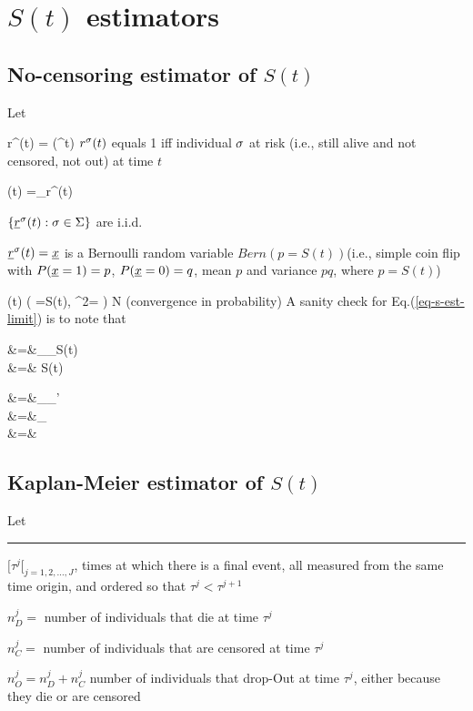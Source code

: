 \section{$S(t)$ estimators}

\subsection{No-censoring estimator of $S(t)$}

Let


\beq
r^\s(t) =  \indi(\tau^\s\geq t)
\eeq
$r^\sigma(t)$ equals 1 iff individual $\sigma$
at risk (i.e., still alive
and not censored, not out) at time $t$

\beq
{}(t) =\sum_\s r^\s(t)
\eeq

$\{{\underline{r}}^\sigma(t):\sigma\in\Sigma\}$ are i.i.d.

${\underline{r}}^\sigma(t)={\underline{x}}$ is
a Bernoulli random variable $Bern(p=S(t))$(i.e.,
simple coin flip with $P({\underline{x}}=1)=p$, $P({\underline{x}}=0)=q$,
mean $p$ and variance $pq$, where $p=S(t)$)

\beq
{}(t)\rarrow
\caln\left(
\mu =S(t), \s^2= \right)
N\rarrow \infty
\label{eq-s-est-limit}
\eeq
 (convergence in probability)
A sanity check for Eq.(\ref{eq-s-est-limit}) is to note that

\beqa
{}
&=&\sum_\s {}_{S(t)}
\\
&=&
S(t)
\eeqa


\beqa
{}
&=&\sum_\s \sum_{\s'}
\\
&=&\sum_\s
{}
\\
&=&
\eeqa

\subsection{Kaplan-Meier estimator of $S(t)$}
Let
\hrule
$[\tau^j[_{j=1,2, \ldots, J}$, times at
which there is a final event, all measured
from the same time origin, and
ordered so that $\tau^j < \tau^{j+1}$

$n_D^j=$ number of individuals
that die  at time $\tau^j$


$n_C^j=$ number of individuals
that are censored at time $\tau^j$


$n_O^j=n_D^j+n_C^j$ number of individuals that drop-Out
at time $\tau^j$, either
because they die or are censored



